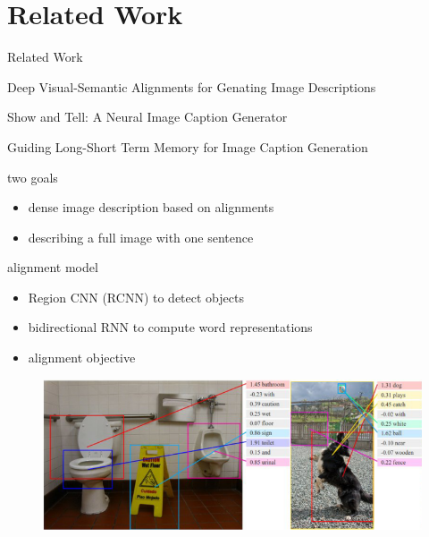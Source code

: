\documentclass[16pt]{beamer}
\newenvironment{wideitemize}{\itemize\addtolength{\itemsep}{10pt}}{\enditemize}
\begin{document}
\section{Related Work}%
\begin{frame}{Related Work}
\begin{wideitemize}
\item Deep Visual-Semantic Alignments for Genating Image Descriptions \cite{Karpathy2015}
\item Show and Tell: A Neural Image Caption Generator \cite{Google}
\item Guiding Long-Short Term Memory for Image Caption Generation \cite{Fernando2015}
\end{wideitemize}
\end{frame}

\begin{frame}{\cite{Karpathy2015}}
\begin{wideitemize}
\item two goals
\begin{itemize}
\item dense image description based on alignments
\item describing a full image with one sentence 
\end{itemize}
\item alignment model
    \begin{itemize}
    \item Region CNN (RCNN) to detect objects \cite{Girshick2014}
    \item bidirectional RNN to compute word representations
    \item alignment objective
    \end{itemize}
\end{wideitemize}

\begin{figure}[tb]
	\centering
	\includegraphics[width=\linewidth]{alignment.PNG}
\end{figure}

\end{frame}
\end{document}

